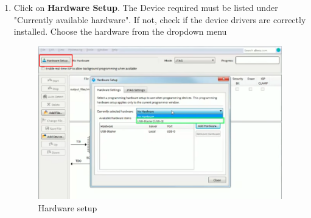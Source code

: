 \documentclass[12pt,singleside,a4paper]{article}
\begin{document}
\begin{enumerate}
     \item Click on \textbf{Hardware Setup}. The Device required must be listed under "Currently available hardware". If not, check if the device drivers are correctly installed. Choose the hardware from the dropdown menu
     \begin{figure}[H]
         \centering
         \includegraphics[scale=0.6]{3.png}
     \caption{Hardware setup}
     \end{figure}
     

\end{enumerate}
\end{document}
